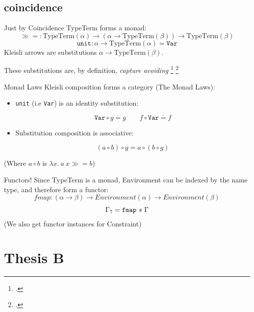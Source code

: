 \documentclass{beamer}
\begin{document}
\subsection{coincidence}
\begin{frame}{Just by Coincidence}
	TypeTerm forms a monad:
	\begin{displaymath}
		\gg\!= : \text{TypeTerm}(\alpha) \rightarrow (\alpha \rightarrow \text{TypeTerm}(\beta)) \rightarrow \text{TypeTerm}(\beta)
	\end{displaymath}
	\begin{displaymath}
		\mathtt{unit} : \alpha \rightarrow \text{TypeTerm}(\alpha) = \mathtt{Var}
	\end{displaymath}
	Kleisli arrows are substitutions $\alpha \rightarrow \text{TypeTerm}(\beta)$. 
	
	\pause
	These substitutions are, by definition, \emph{capture avoiding} \footcite{Bellegarde:1994:SFM:202774.202788} \footcite{Bird:1999:DBN:968699.968702}
		
\end{frame}
\begin{frame}{Monad Laws}
	Kleisli composition forms a category ({\color{darkred}The Monad Laws}):
	\begin{itemize}
		\item {\tt unit} (i.e {\tt Var}) is an identity substitution: 
		
		$$\mathtt{Var} \circ g \stackrel{\cdot}{=} g \qquad f \circ \mathtt{Var} \stackrel{\cdot}{=} f$$
		\item Substitution composition is associative: 
		
		$$(a \circ b) \circ g \stackrel{\cdot}{=} a \circ (b \circ g)$$
    \end{itemize}
	 (Where $a \circ b$ is $\lambda x.\ a\ x \gg\!= b$)
	\end{frame}
	\begin{frame}{Functors!}
		Since TypeTerm is a monad, Environment can be indexed by the name type, and therefore form a functor:
		\pause
		\begin{displaymath}
			fmap : (\alpha \rightarrow \beta) \rightarrow Environment(\alpha) \rightarrow Environment(\beta)  
		\end{displaymath}
		\begin{displaymath}
			\Gamma_\uparrow = {\tt fmap}\ s\ \Gamma
		\end{displaymath}
		(We also get functor instances for Constraint)
	\end{frame}	
	\section{Thesis B}
\end{document}
